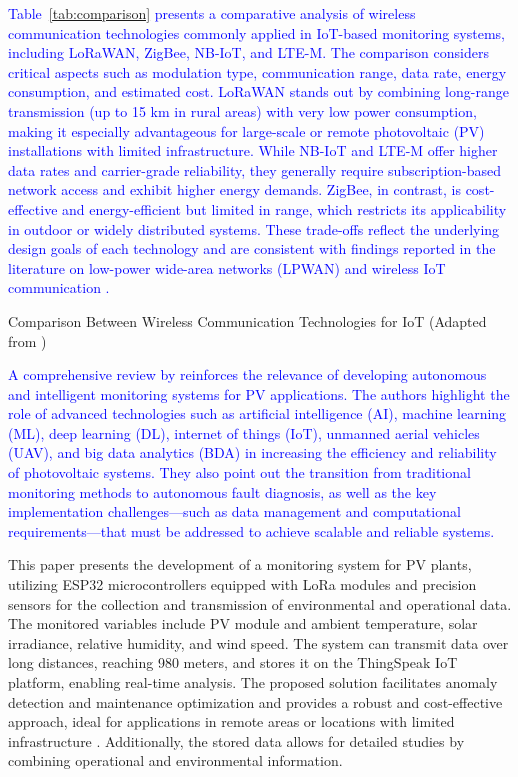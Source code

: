 \textcolor{blue}{
Table~\ref{tab:comparison} presents a comparative analysis of wireless communication technologies commonly applied in IoT-based monitoring systems, including LoRaWAN, ZigBee, NB-IoT, and LTE-M. The comparison considers critical aspects such as modulation type, communication range, data rate, energy consumption, and estimated cost. LoRaWAN stands out by combining long-range transmission (up to 15 km in rural areas) with very low power consumption, making it especially advantageous for large-scale or remote photovoltaic (PV) installations with limited infrastructure. While NB-IoT and LTE-M offer higher data rates and carrier-grade reliability, they generally require subscription-based network access and exhibit higher energy demands. ZigBee, in contrast, is cost-effective and energy-efficient but limited in range, which restricts its applicability in outdoor or widely distributed systems. These trade-offs reflect the underlying design goals of each technology and are consistent with findings reported in the literature on low-power wide-area networks (LPWAN) and wireless IoT communication \cite{raza2017overview, centenaro2016long, mekki2019comparative, ieee802154, zigbee2024spec, lora2021covid, maldonado2021}.
}
\begin{table}[htbp]
\caption{Comparison Between Wireless Communication Technologies for IoT (Adapted from \cite{ansari2021review, ieee802154, maldonado2021})}
\label{tab:comparison}
\end{table}

\textcolor{blue}{
A comprehensive review by \cite{aghaei2024} reinforces the relevance of developing autonomous and intelligent monitoring systems for PV applications. The authors highlight the role of advanced technologies such as artificial intelligence (AI), machine learning (ML), deep learning (DL), internet of things (IoT), unmanned aerial vehicles (UAV), and big data analytics (BDA) in increasing the efficiency and reliability of photovoltaic systems. They also point out the transition from traditional monitoring methods to autonomous fault diagnosis, as well as the key implementation challenges—such as data management and computational requirements—that must be addressed to achieve scalable and reliable systems.
}



This paper presents the development of a monitoring system for PV plants, utilizing ESP32 microcontrollers equipped with LoRa modules and precision sensors for the collection and transmission of environmental and operational data. The monitored variables include PV module and ambient temperature, solar irradiance, relative humidity, and wind speed. The system can transmit data over long distances, reaching 980 meters,  and stores it on the ThingSpeak IoT platform, enabling real-time analysis. The proposed solution facilitates anomaly detection and maintenance optimization and provides a robust and cost-effective approach, ideal for applications in remote areas or locations with limited infrastructure \cite{ansari2021review}. Additionally, the stored data allows for detailed studies by combining operational and environmental information.

